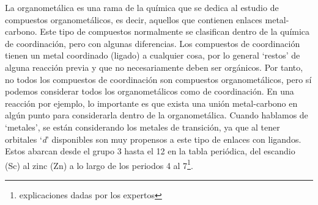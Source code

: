 La organometálica es una rama de la química que se dedica al estudio de compuestos organometálicos, es decir, aquellos que contienen enlaces metal-carbono. Este tipo de compuestos normalmente se clasifican dentro de la química de coordinación, pero con algunas diferencias. Los compuestos de coordinación tienen un metal coordinado (ligado) a cualquier cosa, por lo general `restos' de alguna reacción previa y que no necesariamente deben ser orgánicos. Por tanto, no todos los compuestos de coordinación son compuestos organometálicos, pero sí podemos considerar todos los organometálicos como de coordinación. En una reacción por ejemplo, lo importante es que exista una unión metal-carbono en algún punto para considerarla dentro de la organometálica.
Cuando hablamos de `metales', se están considerando los metales de transición, ya que al tener orbitales `\textit{d}' disponibles son muy propensos a este tipo de enlaces con ligandos. Estos abarcan desde el grupo 3 hasta el 12 en la tabla periódica, del escandio (Sc) al zinc (Zn) a lo largo de los periodos 4 al 7\footnote{explicaciones dadas por los expertos}.


